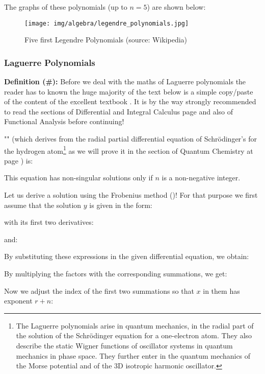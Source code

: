 	The graphs of these polynomials (up to $n = 5$) are shown below:
	\begin{figure}[H]
		\centering
		\texttt{[image: img/algebra/legendre\_polynomials.jpg]}
		\caption[Five first Legendre Polynomials]{Five first Legendre Polynomials (source: Wikipedia)}
	\end{figure}
	
	\subsubsection{Laguerre Polynomials}\label{Laguerre polynomials}
	\textbf{Definition (\#\mydef):} Before we deal with the maths of Laguerre polynomials the reader has to known the huge majority of the text below is a simple copy/paste of the content of the excellent textbook \cite{arfken2013mathematical}. It is by the way strongly recommended to read the sections of Differential and Integral Calculus page \pageref{differential and integral calculus} and also of Functional Analysis \pageref{functional analysis} before continuing!
	
	"" (which derives from the radial partial differential equation of Schrödinger's for the hydrogen atom\footnote{The Laguerre polynomials arise in quantum mechanics, in the radial part of the solution of the Schrödinger equation for a one-electron atom. They also describe the static Wigner functions of oscillator systems in quantum mechanics in phase space. They further enter in the quantum mechanics of the Morse potential and of the 3D isotropic harmonic oscillator.} as we will prove it in the section of Quantum Chemistry at page \pageref{quantum chemistry non-rigid rotator}) is:
	
	This equation has non-singular solutions only if $n$ is a non-negative integer.
	
	Let us derive a solution using the Frobenius method ()! For that purpose we first assume that the solution $y$ is given in the form:
	
	with its first two derivatives:
	
	and:
	
	By substituting these expressions in the given differential equation, we obtain:
	
	By multiplying the factors with the corresponding summations, we get:
	
	Now we adjust the index of the first two summations so that $x$ in them has exponent $r+n$:
	
